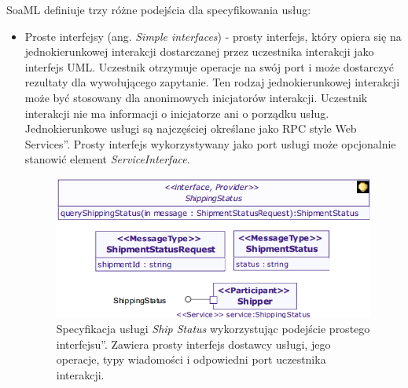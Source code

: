 SoaML definiuje trzy różne podejścia dla specyfikowania usług: 
\begin{itemize}
\item{Proste interfejsy (ang. \emph{Simple interfaces}) - prosty interfejs, który opiera się na jednokierunkowej interakcji dostarczanej przez uczestnika interakcji jako interfejs UML. Uczestnik otrzymuje operacje na swój port i może dostarczyć rezultaty dla wywołującego zapytanie. Ten rodzaj jednokierunkowej interakcji może być stosowany dla anonimowych inicjatorów interakcji. Uczestnik interakcji nie ma informacji o inicjatorze ani o  porządku usług. Jednokierunkowe usługi są najczęściej określane jako \quotedblbase RPC style Web Services\textquotedblright. Prosty interfejs wykorzystywany jako port usługi może opcjonalnie stanowić element \emph{ServiceInterface}.} \cite{SOAMLOMG}

\begin{figure}[h!tbp]
\begin{centering}
\includegraphics[width=11cm]{img/simple_interface_based_approach.png}
\caption[Specyfikacja usługi \emph{Ship Status} wykorzystując podejście \quotedblbase prostego interfejsu\textquotedblright. Zawiera prosty interfejs dostawcy usługi, jego operacje, typy wiadomości i odpowiedni port uczestnika interakcji.]{Specyfikacja usługi \emph{Ship Status} wykorzystując podejście \quotedblbase prostego interfejsu\textquotedblright. Zawiera prosty interfejs dostawcy usługi, jego operacje, typy wiadomości i odpowiedni port uczestnika interakcji. \cite{SoaMLErvBase}}\label{simple_interface_based_approach}
\end{centering}
\end{figure}


\end{itemize}
